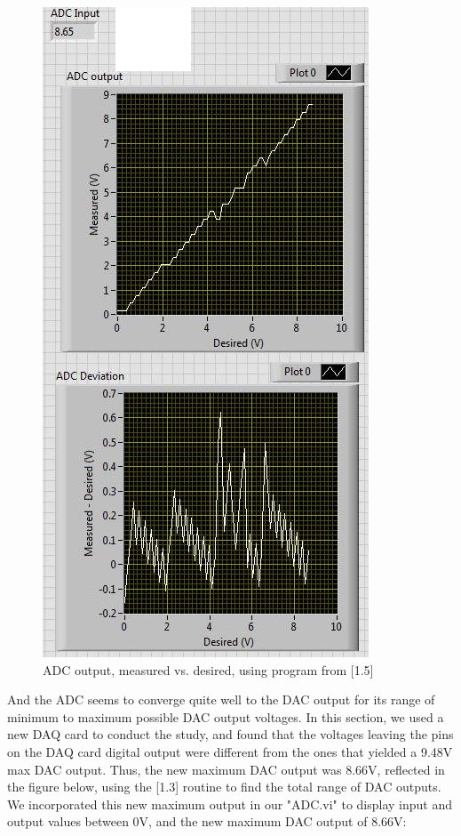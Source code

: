 \documentclass{article}
\begin{document}
    \begin{figure}[H]
        \centering
        \includegraphics[scale = 0.5]{etc.png}
        \caption{ADC output, measured vs. desired, using program from [1.5] \cite{lab10}}
        \label{fig:my_label}
    \end{figure}
    And the ADC seems to converge quite well to the DAC output for its range of minimum to maximum possible DAC output voltages. In this section, we used a new DAQ card to conduct the study, and found that the voltages leaving the pins on the DAQ card digital output were different from the ones that yielded a 9.48V max DAC output. Thus, the new maximum DAC output was 8.66V, reflected in the figure below, using the [1.3] routine to find the total range of DAC outputs. We incorporated this new maximum output in our "ADC.vi" to display input and output values between 0V, and the new maximum DAC output of 8.66V:
\end{document}
